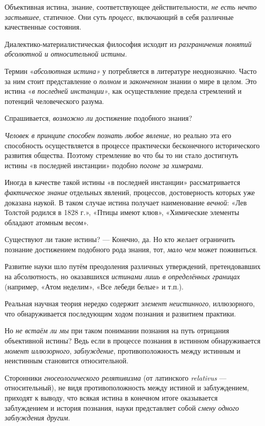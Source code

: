 \documentclass[a4paper,14pt,russian]{extreport}
\begin{document}
Объективная истина, знание, соответствующее действительности, \emph{не есть нечто застывшее}, статичное. Они суть \emph{процесс}, включающий в себя различные качественные состояния.

Диалектико-материалистическая философия исходит из \emph{разграничения понятий абсолютной и относительной истины.}

Термин «\emph{абсолютная истина»} у потребляется в литературе неоднозначно. Часто за ним стоит представление о \emph{полном} и \emph{законченном} знании о мире в целом. Это истина «\emph{в последней инстанции»}, как осуществление предела стремлений и потенций человеческого разума.

Спрашивается, \emph{возможно ли} достижение подобного знания?

\emph{Человек в принципе способен познать любое явление}, но реально эта его способность осуществляется в процессе практически бесконечного исторического развития общества. Поэтому стремление во что бы то ни стало достигнуть истины «в последней инстанции» подобно \emph{погоне за химерами}.

Иногда в качестве такой истины «в последней инстанции» рассматривается \emph{фактическое знание} отдельных явлений, процессов, достоверность которых уже доказана наукой. В таком случае истина получает наименование \emph{вечной}: «Лев Толстой родился в 1828 г.», «Птицы имеют клюв», «Химические элементы обладают атомным весом».

Существуют ли такие истины? --- Конечно, да. Но кто желает ограничить познание достижением подобного рода знания, тот, \emph{мало чем} может поживиться.

Развитие науки шло путём преодоления различных утверждений, претендовавших на абсолютность, но оказавшихся \emph{истинами лишь в определённых границах} (например, «Атом неделим», «Все лебеди белые» и т.п.).

Реальная научная теория нередко содержит \emph{элемент неистинного}, иллюзорного, что обнаруживается последующим ходом познания и развитием практики.

Но \emph{не встаём ли мы} при таком понимании познания на путь отрицания объективной истины? Ведь если в процессе познания в истинном обнаруживается \emph{момент иллюзорного}, \emph{заблуждение}, противоположность между истинным и неистинным становится относительной.

Сторонники \emph{гносеологического релятивизма} (от латинского \emph{relativus} --- относительный), не видя противоположность между истиной и заблуждением, приходят к выводу, что всякая истина в конечном итоге оказывается заблуждением и история познания, науки представляет собой \emph{смену одного заблуждения другим}.
\end{document}
